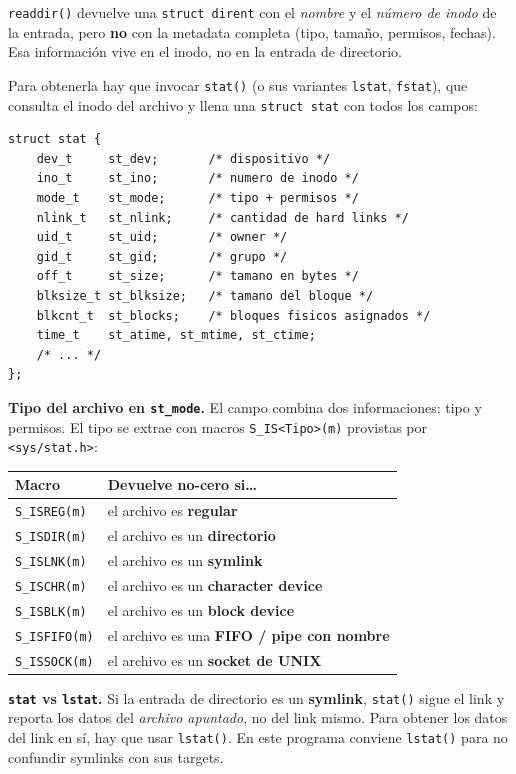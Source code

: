 \documentclass[11pt,a4paper]{article}
\begin{document}
\texttt{readdir()} devuelve una \texttt{struct dirent} con el
\emph{nombre} y el \emph{número de inodo} de la entrada, pero \textbf{no}
con la metadata completa (tipo, tamaño, permisos, fechas). Esa
información vive en el inodo, no en la entrada de directorio.

Para obtenerla hay que invocar \texttt{stat()} (o sus variantes
\texttt{lstat}, \texttt{fstat}), que consulta el inodo del archivo y
llena una \texttt{struct stat} con todos los campos:

\begin{lstlisting}[style=cstyle]
struct stat {
    dev_t     st_dev;       /* dispositivo */
    ino_t     st_ino;       /* numero de inodo */
    mode_t    st_mode;      /* tipo + permisos */
    nlink_t   st_nlink;     /* cantidad de hard links */
    uid_t     st_uid;       /* owner */
    gid_t     st_gid;       /* grupo */
    off_t     st_size;      /* tamano en bytes */
    blksize_t st_blksize;   /* tamano del bloque */
    blkcnt_t  st_blocks;    /* bloques fisicos asignados */
    time_t    st_atime, st_mtime, st_ctime;
    /* ... */
};
\end{lstlisting}

\textbf{Tipo del archivo en \texttt{st\_mode}.} El campo combina dos
informaciones: tipo y permisos. El tipo se extrae con macros
\texttt{S\_IS<Tipo>(m)} provistas por \texttt{<sys/stat.h>}:

\begin{center}
\small
\begin{tabular}{@{}lp{8cm}@{}}
\toprule
Macro              & Devuelve no-cero si\ldots \\
\midrule
\texttt{S\_ISREG(m)}  & el archivo es \textbf{regular} \\
\texttt{S\_ISDIR(m)}  & el archivo es un \textbf{directorio} \\
\texttt{S\_ISLNK(m)}  & el archivo es un \textbf{symlink} \\
\texttt{S\_ISCHR(m)}  & el archivo es un \textbf{character device} \\
\texttt{S\_ISBLK(m)}  & el archivo es un \textbf{block device} \\
\texttt{S\_ISFIFO(m)} & el archivo es una \textbf{FIFO / pipe con nombre} \\
\texttt{S\_ISSOCK(m)} & el archivo es un \textbf{socket de UNIX} \\
\bottomrule
\end{tabular}
\end{center}

\begin{importante}
\textbf{\texttt{stat} vs \texttt{lstat}.} Si la entrada de directorio
es un \textbf{symlink}, \texttt{stat()} sigue el link y reporta los
datos del \emph{archivo apuntado}, no del link mismo. Para obtener los
datos del link en sí, hay que usar \texttt{lstat()}. En este programa
conviene \texttt{lstat()} para no confundir symlinks con sus targets.
\end{importante}
\end{document}
